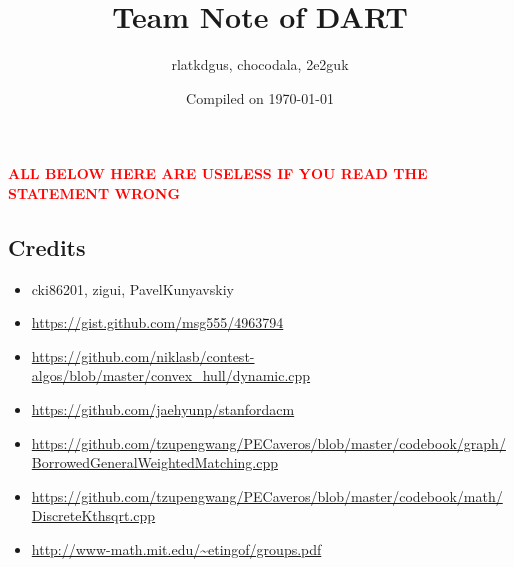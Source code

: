 \documentclass[landscape, 8pt, a4paper, oneside, twocolumn]{extarticle}
\title{Team Note of DART}
\author{rlatkdgus, chocodala, 2e2guk}
\date{Compiled on \today}
\begin{document}
{
	\Large

	\maketitle

\tableofcontents
}
\thispagestyle{fancy}
\pagebreak

\textcolor{red}{\textbf{ALL BELOW HERE ARE USELESS IF YOU READ THE STATEMENT WRONG}}









\subsection {Credits}
\begin{itemize}[noitemsep,nolistsep]
	\item cki86201, zigui, PavelKunyavskiy
	\item \url{https://gist.github.com/msg555/4963794}
	\item \url{https://github.com/niklasb/contest-algos/blob/master/convex_hull/dynamic.cpp}
	\item \url{https://github.com/jaehyunp/stanfordacm}
	\item \url{https://github.com/tzupengwang/PECaveros/blob/master/codebook/graph/BorrowedGeneralWeightedMatching.cpp}
	\item \url{https://github.com/tzupengwang/PECaveros/blob/master/codebook/math/DiscreteKthsqrt.cpp}
	\item \url{http://www-math.mit.edu/~etingof/groups.pdf}
\end{itemize}
\end{document}
